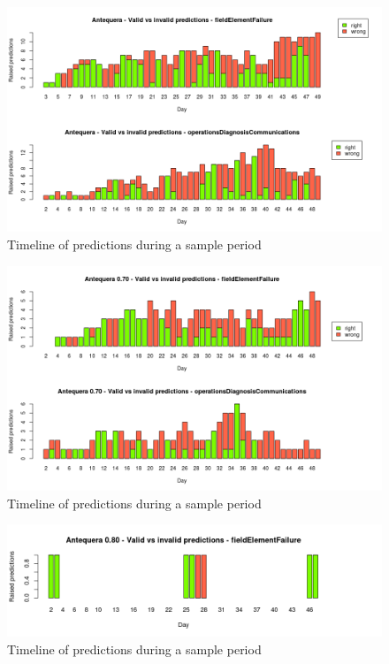 \begin{figure}[hbtp]
\includegraphics[width=\textwidth]{img/scenario_right_wrong.png}
\caption{Timeline of predictions during a sample period} \label{fig:scenario_right_wrong}
\end{figure}

\begin{figure}[hbtp]
\includegraphics[width=\textwidth]{img/scenario_right_wrong_70.png}
\caption{Timeline of predictions during a sample period} \label{fig:scenario_right_wrong_70}
\end{figure}

\begin{figure}[hbtp]
\includegraphics[width=\textwidth]{img/scenario_right_wrong_80.png}
\caption{Timeline of predictions during a sample period} \label{fig:scenario_right_wrong_80}
\end{figure}

